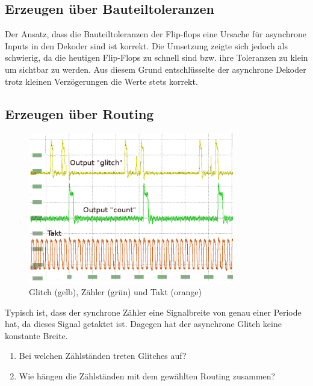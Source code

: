 \subsection{Erzeugen über Bauteiltoleranzen}
Der Ansatz, dass die Bauteiltoleranzen der Flip-flops eine Ursache für asynchrone Inputs in den Dekoder sind ist korrekt. Die Umsetzung zeigte sich jedoch als schwierig, da die heutigen Flip-Flops zu schnell sind bzw. ihre Toleranzen zu klein um sichtbar zu werden.  Aus diesem Grund entschlüsselte der asynchrone Dekoder trotz kleinen Verzögerungen die Werte stets korrekt.\\



\subsection{Erzeugen über Routing} 
\begin{figure}[H]
	\centering
	\includegraphics[width=0.8\textwidth]{images/Glitch_2_good_kommentar.png}
	\caption{Glitch (gelb), Zähler (grün) und Takt (orange)}
	\label{fig.glitch.result_1}
\end{figure}

Typisch ist, dass der synchrone Zähler eine Signalbreite von genau einer Periode hat, da dieses Signal getaktet ist. Dagegen hat der asynchrone Glitch keine konstante Breite.
\begin{enumerate}
	\item{Bei welchen Zählständen treten Glitches auf?}

	\item{Wie hängen die Zählständen mit dem gewählten Routing zusammen?}

\end{enumerate}